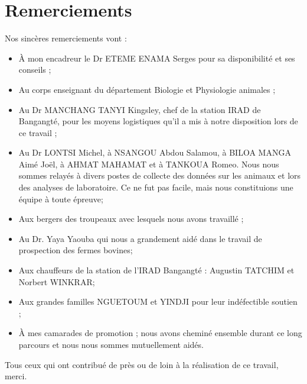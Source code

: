 \chapter*{Remerciements}
Nos sincères remerciements vont :
\begin{itemize}
\item À mon encadreur le Dr ETEME ENAMA Serges pour sa disponibilité et ses conseils ;
\item Au corps enseignant du département Biologie et Physiologie animales ;
\item Au Dr MANCHANG TANYI Kingsley, chef de la station IRAD de Bangangté, pour les moyens logistiques qu’il a mis à notre disposition lors de ce
travail ;
\item Au Dr LONTSI Michel, à NSANGOU Abdou Salamou, à BILOA MANGA Aimé Joël, à AHMAT MAHAMAT et à TANKOUA Romeo. Nous nous sommes relayés à divers postes de collecte des données sur les animaux et lors des analyses de laboratoire. Ce ne fut pas facile, mais nous constituions une équipe à toute épreuve;
\item Aux bergers des troupeaux avec lesquels nous avons travaillé ;
\item Au Dr. Yaya Yaouba qui nous a grandement aidé dans le travail de prospection des fermes bovines;
\item Aux chauffeurs de la station de l’IRAD Bangangté : Augustin
TATCHIM et Norbert WINKRAR;
\item Aux grandes familles NGUETOUM et YINDJI pour leur indéfectible soutien ;
\item À mes camarades de promotion ; nous avons cheminé ensemble durant ce long parcours
et nous nous sommes mutuellement aidés.
\end{itemize}

Tous ceux qui ont contribué de près ou de loin à la réalisation de ce travail, merci.